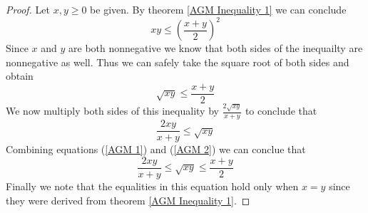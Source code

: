         \begin{proof}
            Let $x, y \ge 0$ be given. By theorem \ref{AGM Inequality 1} we can conclude
            \[
                xy \le \left(\frac{x + y}{2}\right)^2
            \]
            Since $x$ and $y$ are both nonnegative we know that both sides of the inequailty
            are nonnegative as well. Thus we can safely take the square root of both sides
            and obtain
            \begin{equation}
                \label{AGM 1}
                \sqrt{xy} \le \frac{x + y}{2}
            \end{equation}
            We now multiply both sides of this inequality by $\frac{2\sqrt{xy}}{x + y}$ to
            conclude that
            \begin{equation}
                \label{AGM 2}
                \frac{2xy}{x + y} \le \sqrt{xy}
            \end{equation}
            Combining equations (\ref{AGM 1}) and (\ref{AGM 2}) we can conclue that
            \[
                \frac{2xy}{x + y} \le \sqrt{xy} \le \frac{x + y}{2}
            \]
            Finally we note that the equalities in this equation hold only when $x = y$
            since they were derived from theorem \ref{AGM Inequality 1}. \QED
        \end{proof}
